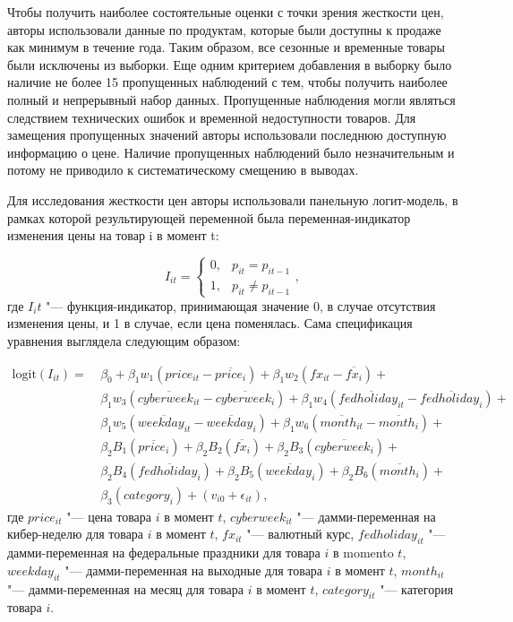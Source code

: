 Чтобы получить наиболее состоятельные оценки с точки зрения жесткости цен, авторы использовали данные по продуктам, которые были доступны к продаже как минимум в течение года. Таким образом, все сезонные и временные товары были исключены из выборки. Еще одним критерием добавления в выборку было наличие не более 15 пропущенных наблюдений с тем, чтобы получить наиболее полный и непрерывный набор данных. Пропущенные наблюдения могли являться следствием технических ошибок и временной недоступности товаров. Для замещения пропущенных значений авторы использовали последнюю доступную информацию о цене. Наличие пропущенных наблюдений было незначительным и потому не приводило к систематическому смещению в выводах.

Для исследования жесткости цен авторы использовали панельную логит-модель, в рамках которой результирующей переменной была переменная-индикатор изменения цены на товар i в момент t:

\begin{equation}
	\label{eq:equation2}
	I_{it} =
	\begin{cases} 
		0, & p_{it} = p_{it-1} \\ 
		1, & p_{it} \neq p_{it-1} 
	\end{cases},
\end{equation}
где \( I_it \) "--- функция-индикатор, принимающая значение 0, в случае отсутствия изменения цены, и 1 в случае, если цена поменялась. Сама спецификация уравнения выглядела следующим образом:

\begin{align}
		\label{eq:equation3}
		\text{logit}(I_{it}) = & \ \beta_0 + \beta_1 w_1 \left( price_{it} - \overline{price_i} \right) + \beta_1 w_2 \left( fx_{it} - \overline{fx_i} \right) +  \nonumber \\
		& \ \beta_1 w_3 \left( \overline{cyberweek_{it}} - \overline{cyberweek_i} \right) + \beta_1 w_4 \left( \overline{fedholiday_{it}} - \overline{fedholiday_i} \right) + \nonumber \\
		& \ \beta_1 w_5 \left( \overline{weekday_{it}} - \overline{weekday_i} \right) + \beta_1 w_6 \left( \overline{month_{it}} - \overline{month_i} \right) + \nonumber \\
		& \ \beta_2 B_1 \left( \overline{price_i} \right) + \beta_2 B_2 \left( \overline{fx_i} \right) + \beta_2 B_3 \left( \overline{cyberweek_i} \right) + \nonumber \\
		& \ \beta_2 B_4 \left( \overline{fedholiday_i} \right) + \beta_2 B_5 \left( \overline{weekday_i} \right) + \beta_2 B_6 \left( \overline{month_i} \right) + \nonumber \\
		& \ \beta_3 \left( category_i \right) + \left(v_{i0} + \epsilon_{it}\right),
\end{align}
где \( price_{it} \) "--- цена товара $i$ в момент $t$, \( cyberweek_{it} \) "--- дамми-переменная на кибер-неделю для товара $i$ в момент $t$, \( fx_{it} \) "--- валютный курс, \( fedholiday_{it} \) "--- дамми-переменная на федеральные праздники для товара $i$ в momento $t$, \( weekday_{it} \) "--- дамми-переменная на выходные для товара $i$ в момент $t$, \( month_{it} \) "--- дамми-переменная на месяц для товара  $i$ в момент $t$, \( category_{it} \) "--- категория товара $i$.

